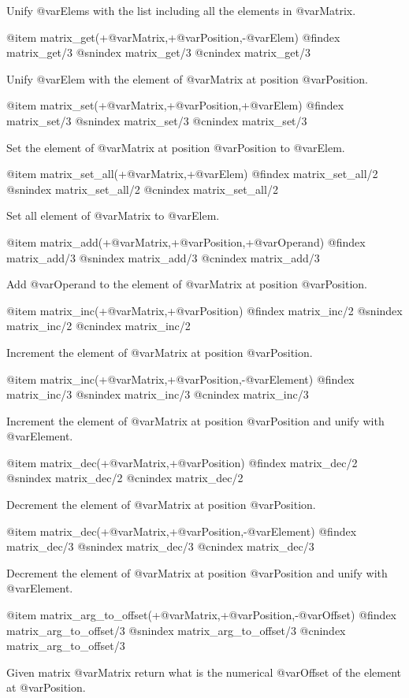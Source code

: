 {{{{{{{{Unify @var{Elems} with the list including all the elements in @var{Matrix}.

@item matrix_get(+@var{Matrix},+@var{Position},-@var{Elem})
@findex matrix_get/3
@snindex matrix_get/3
@cnindex matrix_get/3

Unify @var{Elem} with the element of @var{Matrix} at position
@var{Position}.

@item matrix_set(+@var{Matrix},+@var{Position},+@var{Elem})
@findex matrix_set/3
@snindex matrix_set/3
@cnindex matrix_set/3

Set the element of @var{Matrix} at position
@var{Position} to  @var{Elem}.

@item matrix_set_all(+@var{Matrix},+@var{Elem})
@findex matrix_set_all/2
@snindex matrix_set_all/2
@cnindex matrix_set_all/2

Set all element of @var{Matrix} to @var{Elem}.

@item matrix_add(+@var{Matrix},+@var{Position},+@var{Operand})
@findex matrix_add/3
@snindex matrix_add/3
@cnindex matrix_add/3

Add @var{Operand} to the element of @var{Matrix} at position
@var{Position}.

@item matrix_inc(+@var{Matrix},+@var{Position})
@findex matrix_inc/2
@snindex matrix_inc/2
@cnindex matrix_inc/2

Increment the element of @var{Matrix} at position @var{Position}.

@item matrix_inc(+@var{Matrix},+@var{Position},-@var{Element})
@findex matrix_inc/3
@snindex matrix_inc/3
@cnindex matrix_inc/3

Increment the element of @var{Matrix} at position @var{Position} and
unify with @var{Element}.

@item matrix_dec(+@var{Matrix},+@var{Position})
@findex matrix_dec/2
@snindex matrix_dec/2
@cnindex matrix_dec/2

Decrement the element of @var{Matrix} at position @var{Position}.

@item matrix_dec(+@var{Matrix},+@var{Position},-@var{Element})
@findex matrix_dec/3
@snindex matrix_dec/3
@cnindex matrix_dec/3

Decrement the element of @var{Matrix} at position @var{Position} and
unify with @var{Element}.

@item matrix_arg_to_offset(+@var{Matrix},+@var{Position},-@var{Offset})
@findex matrix_arg_to_offset/3
@snindex matrix_arg_to_offset/3
@cnindex matrix_arg_to_offset/3

Given matrix @var{Matrix} return what is the numerical @var{Offset} of
the element at @var{Position}.

}}}}}}}}
